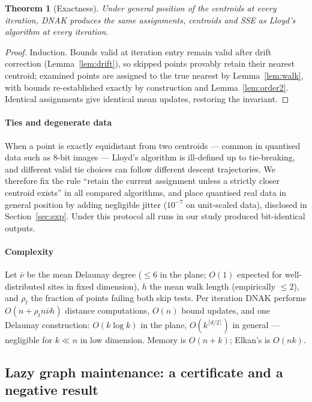 \documentclass[review,12pt]{elsarticle}
\newtheorem{theorem}{Theorem}
\begin{document}
\begin{theorem}[Exactness]\label{thm:exact}
Under general position of the centroids at every iteration, DNAK
produces the same assignments, centroids and SSE as Lloyd's algorithm
at every iteration.
\end{theorem}
\begin{proof}
Induction. Bounds valid at iteration entry remain valid after drift
correction (Lemma~\ref{lem:drift}), so skipped points provably retain
their nearest centroid; examined points are assigned to the true
nearest by Lemma~\ref{lem:walk}, with bounds re-established exactly by
construction and Lemma~\ref{lem:order2}. Identical assignments give
identical mean updates, restoring the invariant.
\end{proof}

\paragraph{Ties and degenerate data}
When a point is exactly equidistant from two centroids --- common in
quantised data such as 8-bit images --- Lloyd's algorithm is
ill-defined up to tie-breaking, and different valid tie choices can
follow different descent trajectories. We therefore fix the rule
``retain the current assignment unless a strictly closer centroid
exists'' in all compared algorithms, and place quantised real data in
general position by adding negligible jitter ($10^{-7}$ on unit-scaled
data), disclosed in Section~\ref{sec:exp}. Under this protocol all
runs in our study produced bit-identical outputs.

\paragraph{Complexity}
Let $\bar\nu$ be the mean Delaunay degree ($\le 6$ in the plane;
$O(1)$ expected for well-distributed sites in fixed dimension), $h$
the mean walk length (empirically $\le 2$), and $\rho_t$ the fraction
of points failing both skip tests. Per iteration DNAK performs
$O(n+\rho_t n\bar\nu h)$ distance computations, $O(n)$ bound updates,
and one Delaunay construction: $O(k\log k)$ in the plane,
$O(k^{\lceil d/2\rceil})$ in general --- negligible for $k\ll n$ in
low dimension. Memory is $O(n+k)$; Elkan's is $O(nk)$.

\subsection{Lazy graph maintenance: a certificate and a negative result}
\label{sec:lazy}
\end{document}
